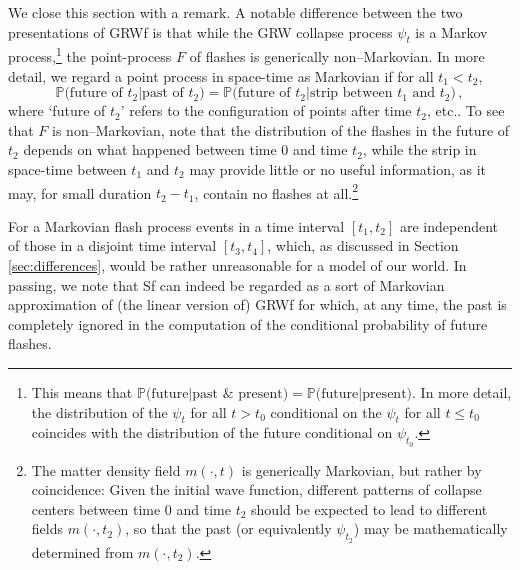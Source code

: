 \documentclass[12pt]{article}
\newcommand{\PPP}{\mathbb{P}}
\begin{document}
We close this section with a remark. A notable difference between the two presentations of {\sf GRWf} is that while the {\sf GRW} collapse process $\psi_t$ is a Markov process,\footnote{This means that
$\PPP\bigl(\text{future}\big|\text{past } \& \text{ present}\bigr) = \PPP\bigl(\text{future}\big|\text{present}\bigr)$. In
more detail, the distribution of the $\psi_t$ for all $t>t_0$ conditional on the $\psi_t$ for all $t \leq t_0$ coincides with the distribution of the future conditional on $\psi_{t_0}$.} 
the point-process $F$ of flashes is generically non--Markovian. In more detail, we regard a point process in space-time
as Markovian if for all $t_1<t_2$,
\begin{equation}
 \PPP\bigl(\text{future of }t_2\big|\text{past of }t_2\bigr)
  = \PPP\bigl(\text{future of }t_2 \big|
  \text{strip between $t_1$ and $t_2$}\bigr)\, ,
\end{equation}
where `future of $t_2$' refers to the configuration of points after time $t_2$, etc..
To see that $F$ is non--Markovian, note that the distribution
of the flashes in the future of $t_2$ depends on what happened between time
0 and time $t_2$, while the strip in space-time between $t_1$ and $t_2$ may provide
little or no useful information, as it may, for
small duration $t_2-t_1$, contain no flashes at all.\footnote{The matter density field $m(\cdot,t)$ is generically Markovian, but rather by coincidence: Given the initial wave function, different
patterns of collapse centers between time 0 and time $t_2$ should be expected to lead to different fields $m(\cdot,t_2)$, so
that the past (or equivalently $\psi_{t_2}$) may be mathematically determined from $m(\cdot,t_2)$.}

For a Markovian flash process events in a time interval $[t_1,t_2]$ are independent of those in a disjoint time interval $[t_3,t_4]$, which, as discussed in Section \ref{sec:differences}, would be rather unreasonable for a model of our world. In passing, we note that {\sf Sf} can indeed be regarded as a sort  
of  Markovian approximation of (the linear version of) {\sf GRWf} for  
which, at any time, the past is completely ignored in the  
computation of the conditional probability of future flashes.
\end{document}
